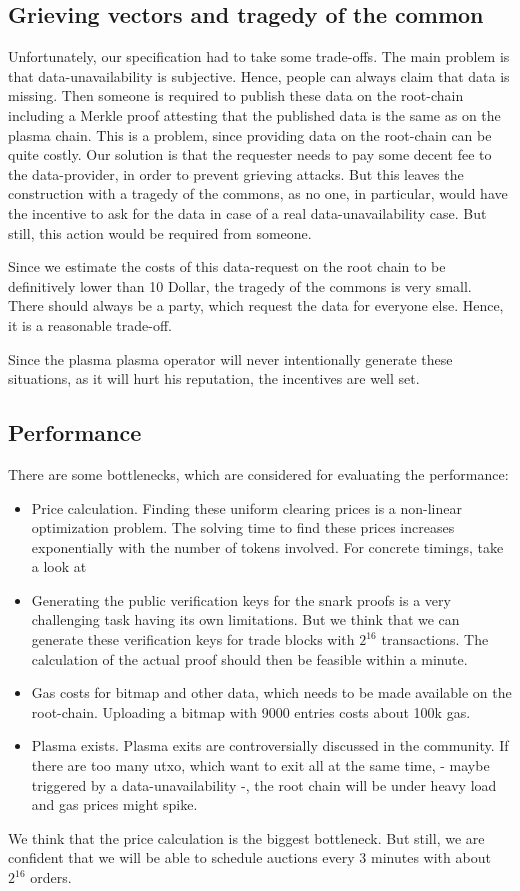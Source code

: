 \documentclass[11pt,parskip=full]{scrartcl}%
\begin{document}
\subsection{Grieving vectors and tragedy of the common}
Unfortunately, our specification had to take some trade-offs. 
The main problem is that data-unavailability is subjective. 
Hence, people can always claim that data is missing. 
Then someone is required to publish these data on the root-chain including a Merkle proof attesting that the published data is the same as on the plasma chain. 
This is a problem, since providing data on the root-chain can be quite costly. 
Our solution is that the requester needs to pay some decent fee to the data-provider, in order to prevent grieving attacks. 
But this leaves the construction with a tragedy of the commons, as no one, in particular, would have the incentive to ask for the data in case of a real data-unavailability case. 
But still, this action would be required from someone. 

Since we estimate the costs of this data-request on the root chain to be definitively lower than 10 Dollar, the tragedy of the commons is very small. 
There should always be a party, which request the data for everyone else. Hence, it is a reasonable trade-off. 

Since the plasma plasma operator will never intentionally generate these situations, as it will hurt his reputation, the incentives are well set. 

\subsection{Performance}
There are some bottlenecks, which are considered for evaluating the performance:
\begin{itemize}
\item Price calculation. 
Finding these uniform clearing prices is a non-linear optimization problem. 
The solving time to find these prices increases exponentially with the number of tokens involved. For concrete timings, take a look at \cite{priceOptimization}
\item Generating the public verification keys for the snark proofs is a very challenging task having its own limitations. 
But we think that we can generate these verification keys for trade blocks with $2^{16}$ transactions. 
The calculation of the actual proof should then be feasible within a minute. 
\item Gas costs for bitmap and other data, which needs to be made available on the root-chain. 
Uploading a bitmap with 9000 entries costs about 100k gas. 
\item Plasma exists.
Plasma exits are controversially discussed in the community. 
If there are too many utxo, which want to exit all at the same time, - maybe triggered by a data-unavailability -, the root chain will be under heavy load and gas prices might spike. 
\end{itemize}
We think that the price calculation is the biggest bottleneck. 
But still, we are confident that we will be able to schedule auctions every 3 minutes with about $2^{16}$ orders. 
\end{document}
